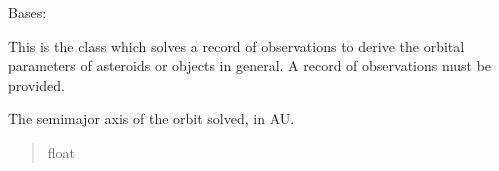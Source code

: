 \documentclass[letterpaper,11pt,english]{sphinxmanual}
\begin{document}
\begin{savenotes}\begin{fulllineitems}
\label{\detokenize{code/opihiexarata.orbit.solution:opihiexarata.orbit.solution.OrbitalSolution}}
\pysigstartsignatures
{}
\pysigstopsignatures
\sphinxAtStartPar
Bases: {\hyperref[\detokenize{code/opihiexarata.library.engine:opihiexarata.library.engine.ExarataSolution}]{}}

\sphinxAtStartPar
This is the class which solves a record of observations to derive the
orbital parameters of asteroids or objects in general. A record of
observations must be provided.

\begin{savenotes}\begin{fulllineitems}
\label{\detokenize{code/opihiexarata.orbit.solution:opihiexarata.orbit.solution.OrbitalSolution.semimajor_axis}}
\pysigstartsignatures
{}
\pysigstopsignatures
\sphinxAtStartPar
The semi\sphinxhyphen{}major axis of the orbit solved, in AU.
\begin{quote}\begin{description}
\sphinxAtStartPar
float

\end{description}\end{quote}

\end{fulllineitems}\end{savenotes}



\end{fulllineitems}
\end{savenotes}
\end{document}
